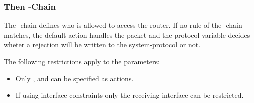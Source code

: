 \subsubsection{Then -Chain}

The -chain defines who is allowed to access the router.
If no rule of the -chain matches, the default action
handles the packet and the protocol variable decides wheter a rejection
will be written to the system-protocol or not.

The following restrictions apply to the parameters:
\begin{itemize}
  \item Only ,  and 
    can be specified as actions.
  \item If using interface constraints only the receiving
    interface can be restricted.
\end{itemize}

